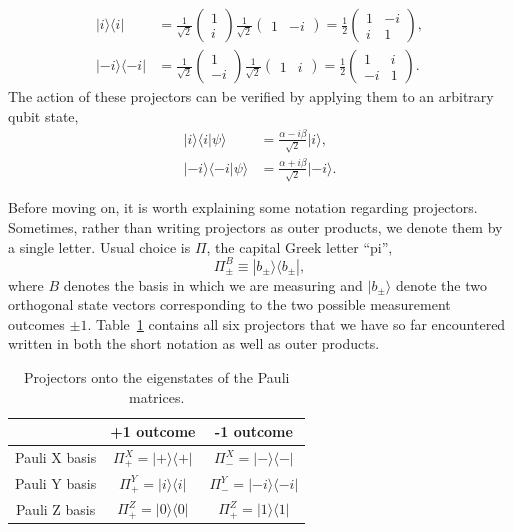 \begin{align}
    |i\rangle\langle i| & = \frac{1}{\sqrt{2}} \begin{pmatrix} 1 \\ i \end{pmatrix} \frac{1}{\sqrt{2}} \begin{pmatrix} 1 & -i \end{pmatrix} = \frac{1}{2} \begin{pmatrix} 1 & -i \\ i & 1 \end{pmatrix}, \\
    |-i\rangle\langle-i| & = \frac{1}{\sqrt{2}} \begin{pmatrix} 1 \\ -i \end{pmatrix} \frac{1}{\sqrt{2}} \begin{pmatrix} 1 & i \end{pmatrix} = \frac{1}{2} \begin{pmatrix} 1 & i \\ -i & 1 \end{pmatrix}.
\end{align}
The action of these projectors can be verified by applying them to an arbitrary qubit state,
\begin{align}
    |i\rangle\langle i|\psi\rangle & = \frac{\alpha-i\beta}{\sqrt{2}} |i\rangle, \\
    |-i\rangle\langle-i|\psi\rangle & = \frac{\alpha+i\beta}{\sqrt{2}} |-i\rangle.
\end{align}

Before moving on, it is worth explaining some notation regarding projectors.
Sometimes, rather than writing projectors as outer products, we denote them by a single letter.
Usual choice is $\Pi$, the capital Greek letter ``pi'',
\begin{equation}
    \Pi_{\pm}^B \equiv |b_{\pm}\rangle\langle b_{\pm}|,
\end{equation}
where $B$ denotes the basis in which we are measuring and $|b_{\pm}\rangle$ denote the two orthogonal state vectors corresponding to the two possible measurement outcomes $\pm1$.
Table~\ref{tab:3-2_projectors} contains all six projectors that we have so far encountered written in both the short notation as well as outer products.
\begin{table}[h]
    \centering
    \begin{tabular}{c|c|c}
         & +1 outcome & -1 outcome \\
         \hline
        Pauli X basis & $\Pi^X_+ = |+\rangle\langle+|$ & $\Pi^X_- = |-\rangle\langle-|$ \\
        Pauli Y basis & $\Pi^Y_+ = |i\rangle\langle i|$ & $\Pi^Y_- = |-i\rangle\langle -i|$ \\
        Pauli Z basis & $\Pi^Z_+ = |0\rangle\langle 0|$ & $\Pi^Z_+ = |1\rangle\langle 1|$ \\
    \end{tabular}
    \caption{Projectors onto the eigenstates of the Pauli matrices.}
    \label{tab:3-2_projectors}
\end{table}

